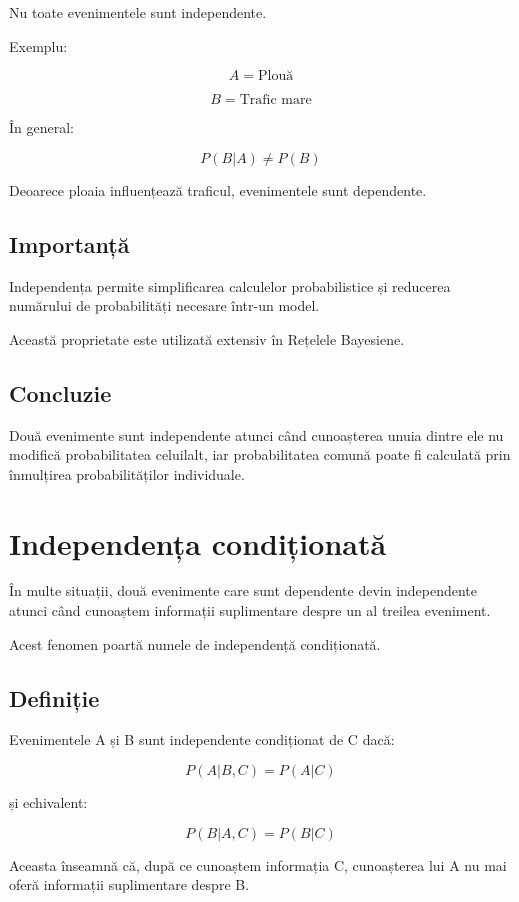 \documentclass[12pt,a4paper]{article}
\begin{document}
Nu toate evenimentele sunt independente.

Exemplu:

\[
A = \mbox{Plouă}
\]

\[
B = \mbox{Trafic mare}
\]

În general:

\[
P(B|A)
\neq
P(B)
\]

Deoarece ploaia influențează traficul, evenimentele sunt dependente.

\subsection{Importanță}

Independența permite simplificarea calculelor probabilistice și reducerea numărului de probabilități necesare într-un model.

Această proprietate este utilizată extensiv în Rețelele Bayesiene.

\subsection{Concluzie}

Două evenimente sunt independente atunci când cunoașterea unuia dintre ele nu modifică probabilitatea celuilalt, iar probabilitatea comună poate fi calculată prin înmulțirea probabilităților individuale.


\section{Independența condiționată}

În multe situații, două evenimente care sunt dependente devin independente atunci când cunoaștem informații suplimentare despre un al treilea eveniment.

Acest fenomen poartă numele de independență condiționată.

\subsection{Definiție}

Evenimentele A și B sunt independente condiționat de C dacă:

\[
P(A|B,C)
=
P(A|C)
\]

și echivalent:

\[
P(B|A,C)
=
P(B|C)
\]

Aceasta înseamnă că, după ce cunoaștem informația C, cunoașterea lui A nu mai oferă informații suplimentare despre B.
\end{document}
